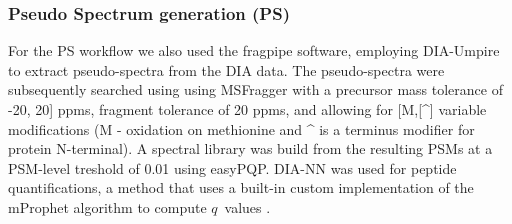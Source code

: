 \documentclass[10pt,letterpaper]{article}
\begin{document}


\subsubsection*{Pseudo Spectrum generation (PS)}

 For the PS workflow we also used the fragpipe software, employing DIA-Umpire to extract pseudo-spectra from the DIA data. The pseudo-spectra were subsequently searched using using MSFragger with a precursor mass tolerance of -20, 20] ppms, fragment tolerance of 20 ppms, and allowing for [M,[\^{}] variable modifications (M - oxidation on methionine and \^{} is a terminus modifier for protein N-terminal).  A spectral library was build from the resulting PSMs at a PSM-level treshold of 0.01  using easyPQP. DIA-NN was used for peptide quantifications, a method that uses a built-in custom implementation of the mProphet algorithm to compute $q$~values \cite{reiter2011mprophet, demichev2020dia}.
 


\end{document}
